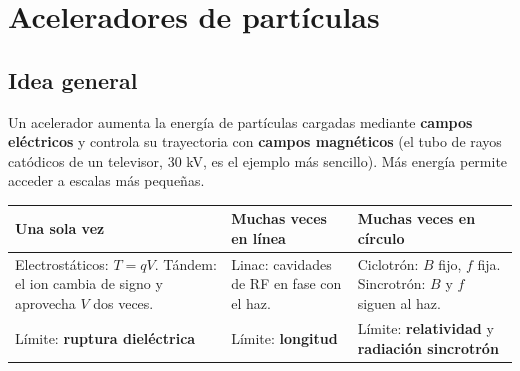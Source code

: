 \chapter{Aceleradores de partículas}

\section{Idea general}
Un acelerador aumenta la energía de partículas cargadas mediante \textbf{campos eléctricos} y controla su trayectoria con
\textbf{campos magnéticos} (el tubo de rayos catódicos de un televisor, 30 kV, es el ejemplo más sencillo). Más energía permite
acceder a escalas más pequeñas.

\begin{clave}
\begin{center}\small
\begin{tabularx}{\linewidth}{XXX}
\toprule
\textbf{Una sola vez} & \textbf{Muchas veces en línea} & \textbf{Muchas veces en círculo}\\
\midrule
Electrostáticos: $T=qV$. Tándem: el ion cambia de signo y aprovecha $V$ dos veces. &
Linac: cavidades de RF en fase con el haz. &
Ciclotrón: $B$ fijo, $f$ fija. Sincrotrón: $B$ y $f$ siguen al haz.\\
\midrule
Límite: \textbf{ruptura dieléctrica} & Límite: \textbf{longitud} & Límite: \textbf{relatividad} y \textbf{radiación sincrotrón}\\
\bottomrule
\end{tabularx}
\end{center}
\end{clave}

